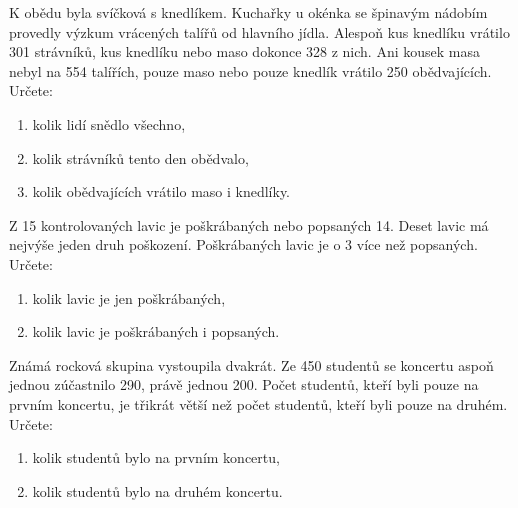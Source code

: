 \documentclass[12pt,a4paper]{article}
\begin{document}
\begin{exercise}
K obědu byla svíčková s knedlíkem. Kuchařky u okénka se špinavým nádobím 
provedly výzkum vrácených talířů od hlavního jídla. Alespoň kus knedlíku vrátilo 
301 strávníků, kus knedlíku nebo maso dokonce 328 z nich. Ani kousek masa nebyl 
na 554 talířích, pouze maso nebo pouze knedlík vrátilo 250 obědvajících. Určete:
\begin{enumerate}[label=\alph*)]
    \item kolik lidí snědlo všechno,
    \item kolik strávníků tento den obědvalo,
    \item kolik obědvajících vrátilo maso i knedlíky.
\end{enumerate}
\end{exercise}


\begin{exercise}
Z 15 kontrolovaných lavic je poškrábaných nebo popsaných 14.
Deset lavic má nejvýše jeden druh poškození.
Poškrábaných lavic je o 3 více než popsaných.
Určete:
\begin{enumerate}[label=\alph*)]
    \item kolik lavic je jen poškrábaných,
    \item kolik lavic je poškrábaných i popsaných.
\end{enumerate}
\end{exercise}


\begin{exercise}
Známá rocková skupina vystoupila dvakrát. Ze 450 studentů se koncertu aspoň jednou zúčastnilo 290, právě jednou 200.
Počet studentů, kteří byli pouze na prvním koncertu, je třikrát větší než počet studentů, kteří byli pouze na druhém.
Určete:
\begin{enumerate}[label=\alph*)]
    \item kolik studentů bylo na prvním koncertu,
    \item kolik studentů bylo na druhém koncertu.
\end{enumerate}
\end{exercise}
\end{document}
